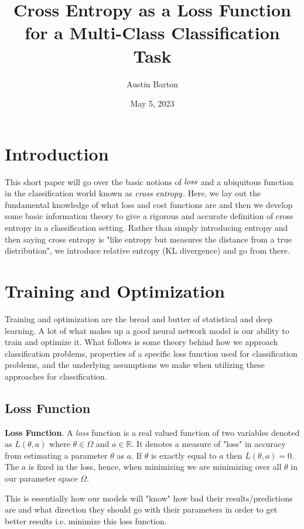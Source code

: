 \documentclass[12pt]{article}
\title{\vspace{-40pt}\hspace{28pt}\textbf{Cross Entropy as a Loss Function for a Multi-Class Classification Task}}
\author[1]{Austin Barton}
\date{May 5, 2023}
\theoremstyle{definition}
\numberwithin{equation}{section}
\newcommand{\R}{\ensuremath{\mathbb{R}}}
\begin{document}
\maketitle

\thispagestyle{empty}
\section*{Introduction}
This short paper will go over the basic notions of $\emph{loss}$ and a ubiquitous function in the classification world known as $\emph{cross entropy}$. Here, we lay out the fundamental knowledge of what loss and cost functions are and then we develop some basic information theory to give a rigorous and accurate definition of cross entropy in a classification setting. Rather than simply introducing entropy and then saying cross entropy is "like entropy but measures the distance from a true distribution", we introduce relative entropy (KL divergence) and go from there.

\section{Training and Optimization}

Training and optimization are the bread and butter of statistical and deep learning. A lot of what makes up a good neural network model is our ability to train and optimize it. What follows is some theory behind how we approach classification problems, properties of a specific loss function used for classification problems, and the underlying assumptions we make when utilizing these approaches for classification.

\subsection{Loss Function}
 \textbf{Loss Function}. A \emph{loss} function is a real valued function of two variables denoted as $L(\theta, a)$ where $\theta \in \Omega$ and $a\in \R$. It denotes a measure of "loss" in accuracy from estimating a parameter $\theta$ as $a$. If $\theta$ is exactly equal to $a$ then $L(\theta, a) = 0$. The $a$ is fixed in the loss, hence, when minimizing we are minimizing over all $\theta$ in our parameter space $\Omega$. 

This is essentially how our models will "know" how bad their results/predictions are and what direction they should go with their parameters in order to get better results i.e. minimize this loss function. %
\end{document}
